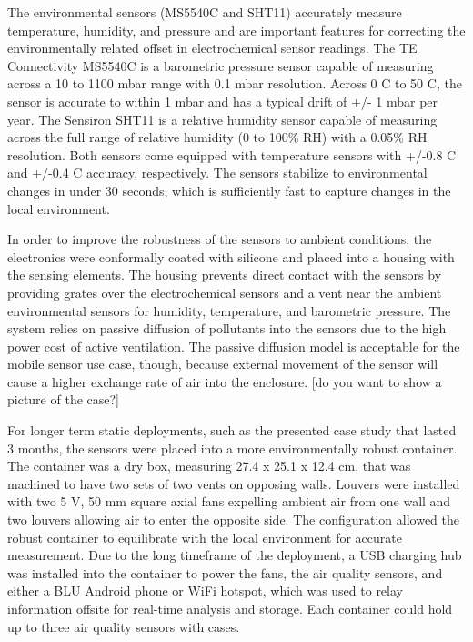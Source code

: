 \documentclass[journal abbreviation, manuscript]{copernicus}
\begin{document}
The environmental sensors (MS5540C and SHT11) accurately measure temperature, humidity, and pressure and are important features for correcting the environmentally related offset in electrochemical sensor readings. The TE Connectivity MS5540C is a barometric pressure sensor capable of measuring
across a 10 to 1100 mbar range with 0.1 mbar resolution. Across 0 C to 50 C, the sensor is accurate to within 1 mbar and has a typical drift of +/- 1 mbar per year. The Sensiron SHT11 is a relative humidity sensor capable of measuring across the full range of relative humidity (0 to 100\% RH) with a 0.05\% RH resolution. Both sensors come equipped with temperature sensors with +/-0.8 C and +/-0.4 C accuracy, respectively. The sensors stabilize to environmental changes in under 30 seconds, which is sufficiently fast to capture changes in the local environment.

In order to improve the robustness of the sensors to ambient conditions, the electronics were conformally coated with silicone and placed into a housing with the sensing elements. The housing prevents direct contact with the sensors by providing grates over the electrochemical sensors and a vent near the ambient environmental sensors for humidity, temperature, and barometric pressure. The system relies on passive diffusion of pollutants into the sensors due to the high power cost of active ventilation. The passive diffusion model is acceptable for the mobile sensor use case, though, because external movement of the sensor will cause a higher exchange rate of air into the enclosure.  [do you want to show a picture of the case?]  

For longer term static deployments, such as the presented case study that lasted 3 months, the sensors were placed into a more environmentally robust container. The container was a dry box, measuring 27.4 x 25.1 x 12.4 cm, that was machined to have two sets of two vents on opposing walls. Louvers were installed with two 5 V, 50 mm square axial fans expelling ambient air from one wall and two louvers allowing air to enter the opposite side. The configuration allowed the robust container to equilibrate with the local environment for accurate measurement. Due to the long timeframe of the deployment, a USB charging hub was installed into the container to power the fans, the air quality sensors, and either a BLU Android phone or WiFi hotspot, which was used to relay information offsite for real-time analysis and storage. Each container could hold up to three air quality sensors with cases.
\end{document}
